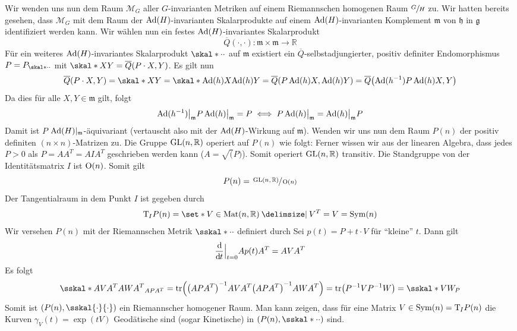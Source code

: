 Wir wenden uns nun dem Raum $\mathcal{M}_G$ aller $G$-invarianten Metriken auf einem Riemannschen homogenen Raum $\sfrac{G}{H}$ zu.
Wir hatten bereits gesehen, dass $\mathcal{M}_G$ mit dem Raum der $\operatorname{Ad}(H)$-invarianten Skalarprodukte auf einem $\operatorname{Ad}(H)$-invarianten Komplement $\mathfrak{m}$ von $\mathfrak{h}$ in $\mathfrak{g}$ identifiziert werden kann.
Wir wählen nun ein festes $\operatorname{Ad}(H)$-invariantes  Skalarprodukt
\[
	\overline{Q}(\cdot ,\cdot ) \colon \mathfrak{m} \times \mathfrak{m} \longrightarrow \mathbb{R}
\]
Für ein weiteres $\operatorname{Ad}(H)$-invariantes Skalarprodukt $\skal*{\cdot }{\cdot }$ auf $\mathfrak{m}$ existiert ein $\overline{Q}$-selbstadjungierter, positiv definiter Endomorphismus $P= P_{\skal*{\cdot }{\cdot }}$ mit $\skal*{X}{Y} = \overline{Q}(P \cdot X,Y)$.
Es gilt nun
\begin{align}
	\overline{Q}(P \cdot X,Y) = \skal*{X}{Y} = \skal*{\Ad(h)X}{\Ad(h)Y} = \overline{Q} \enbrace*{P \Ad(h)X, \Ad(h)Y} = \overline{Q} \enbrace*{\Ad(h^{-1}) P \Ad(h) X,Y}
\end{align}
Da dies für alle $X,Y \in \mathfrak{m}$ gilt, folgt
\[
	\operatorname{Ad}(h^{-1})\big|_{\mathfrak{m}} P \operatorname{Ad}(h)\big|_{\mathfrak{m}} = P \iff P \operatorname{Ad}(h)\big|_{\mathfrak{m}} = \operatorname{Ad}(h)\big|_{\mathfrak{m}} P
\]
Damit ist $P$ $\operatorname{Ad}(H)|_{\mathfrak{m}}$-äquivariant (vertauscht also mit der $\operatorname{Ad}(H)$-Wirkung auf $\mathfrak{m}$).
Wenden wir uns nun dem Raum $P(n)$ der positiv definiten $(n \times n)$-Matrizen zu.
Die Gruppe $\operatorname{GL}(n,\mathbb{R})$ operiert auf $P(n)$ wie folgt:
Ferner wissen wir aus der linearen Algebra, dass jedes $P>0$ als $P=AA^T = A I A^T$ geschrieben werden kann ($A= \sqrt(P)$).
Somit operiert $\operatorname{GL}(n,\mathbb{R})$ transitiv.
Die Standgruppe von der Identitätsmatrix $I$ ist $\operatorname{O}(n)$.
Somit gilt
\[
	P(n) = \sfrac{\operatorname{GL}(n,\mathbb{R})}{\operatorname{O}(n)}
\]
Der Tangentialraum in dem Punkt $I$ ist gegeben durch
\[
	\Tmap_I P(n) = \set*{V \in \Mat(n,\mathbb{R}) \given V^T = V} = \Sym(n)
\]
Wir versehen $P(n)$ mit der Riemannschen Metrik $\sskal*{\cdot }{\cdot }$ definiert durch
Sei $p(t)= P + t \cdot V$ für \enquote{kleine} $t$.
Dann gilt
\[
	\frac{\mathrm{d}\mkern-1.0mu }{\mathrm{d}\mkern-1.0mu t} \Big|_{t=0} A p(t) A^T = A V A^T
\]
Es folgt
\[
	\sskal*{A VA^T}{AWA^T}_{AP A^T} = \tr \enbrace*{ \enbrace*{A P A^T}^{-1} A V A^T \enbrace*{A P A^T}^{-1} A W A^T} = \tr \enbrace*{P^{-1} V P^{-1} W} = \sskal*{V}{W}_P
\]
Somit ist $\enbrace*{P(n), \sskal{\cdot }{\cdot }}$ ein Riemannscher homogener Raum.
Man kann zeigen, dass für eine Matrix $V \in \operatorname{Sym}(n) = \mathrm{T}\mkern-0.85mu_I P(n)$ die Kurven $\gamma_V(t) = \exp(tV)$ Geodätische sind (sogar Kinetische) in $\enbrace*{P(n),\sskal*{\cdot }{\cdot }}$ sind.

